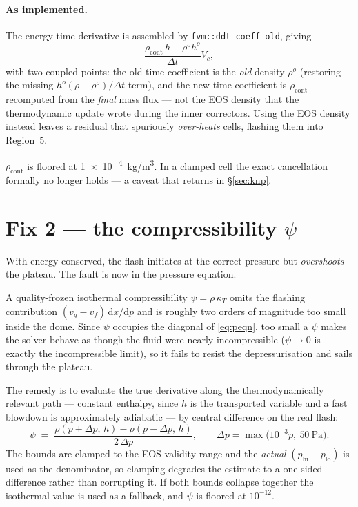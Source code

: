 \documentclass[11pt,a4paper]{article}
\newcommand{\dt}{\Delta t}
\newcommand{\rhocont}{\rho_{\mathrm{cont}}}
\begin{document}
\paragraph{As implemented.} The energy time derivative is assembled by
\texttt{fvm::ddt\_coeff\_old}, giving
\begin{equation}
  \frac{\rhocont\, h - \rho^{o} h^{o}}{\dt} V_c ,
\end{equation}
with two coupled points: the old-time coefficient is the \emph{old} density
$\rho^o$ (restoring the missing $h^o(\rho-\rho^o)/\dt$ term), and the new-time
coefficient is $\rhocont$ recomputed from the \emph{final} mass flux --- not the
EOS density that the thermodynamic update wrote during the inner correctors.
Using the EOS density instead leaves a residual that spuriously \emph{over-heats}
cells, flashing them into Region~5.

$\rhocont$ is floored at \SI{1e-4}{kg/m^3}. In a clamped cell the exact
cancellation formally no longer holds --- a caveat that returns in
\S\ref{sec:knp}.

\section{Fix 2 --- the compressibility \texorpdfstring{$\psi$}{psi}}\label{sec:psi}

With energy conserved, the flash initiates at the correct pressure but
\emph{overshoots} the plateau. The fault is now in the pressure equation.

A quality-frozen isothermal compressibility $\psi = \rho\,\kappa_T$ omits the
flashing contribution $(v_g - v_f)\,\mathrm{d}x/\mathrm{d}p$ and is roughly two
orders of magnitude too small inside the dome. Since $\psi$ occupies the
diagonal of \eqref{eq:peqn}, too small a $\psi$ makes the solver behave as though
the fluid were nearly incompressible ($\psi \to 0$ is exactly the incompressible
limit), so it fails to resist the depressurisation and sails through the plateau.

The remedy is to evaluate the true derivative along the thermodynamically
relevant path --- constant enthalpy, since $h$ is the transported variable and a
fast blowdown is approximately adiabatic --- by central difference on the real
flash:
\begin{equation}
  \psi \;=\;
  \frac{\rho(p+\Delta p,\,h) - \rho(p-\Delta p,\,h)}{2\,\Delta p},
  \qquad
  \Delta p = \max\!\big(10^{-3} p,\ \SI{50}{\pascal}\big).
  \label{eq:psi}
\end{equation}
The bounds are clamped to the EOS validity range and the \emph{actual}
$(p_{\mathrm{hi}} - p_{\mathrm{lo}})$ is used as the denominator, so clamping
degrades the estimate to a one-sided difference rather than corrupting it. If
both bounds collapse together the isothermal value is used as a fallback, and
$\psi$ is floored at $10^{-12}$.
\end{document}
